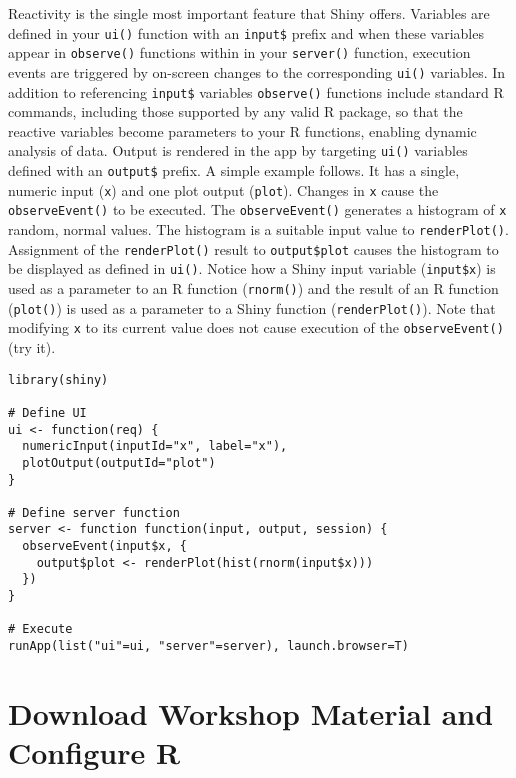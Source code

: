 \documentclass[10pt, letterpaper]{article}
\begin{document}
\begin{spacing}{1.0}
Reactivity is the single most important feature that Shiny offers.  Variables are defined in your \texttt{ui()} function with an \texttt{input\$} prefix and when these variables appear in \texttt{observe()} functions within in your \texttt{server()} function, execution events are triggered by on-screen changes to the corresponding \texttt{ui()} variables.  In addition to referencing \texttt{input\$} variables \texttt{observe()} functions include standard R commands, including those supported by any valid R package, so that the reactive variables become parameters to your R functions, enabling dynamic analysis of data.  Output is rendered in the app by targeting \texttt{ui()} variables defined with an \texttt{output\$} prefix.  A simple example follows.  It has a single, numeric input (\texttt{x}) and one plot output (\texttt{plot}).  Changes in \texttt{x} cause the \texttt{observeEvent()} to be executed.  The \texttt{observeEvent()} generates a histogram of \texttt{x} random, normal values.  The histogram is a suitable input value to \texttt{renderPlot()}.  Assignment of the \texttt{renderPlot()} result to \texttt{output\$plot} causes the histogram to be displayed as defined in \texttt{ui()}.  Notice how a Shiny input variable (\texttt{input\$x}) is used as a parameter to an R function (\texttt{rnorm()}) and the result of an R function (\texttt{plot()}) is used as a parameter to a Shiny function (\texttt{renderPlot()}).  Note that modifying \texttt{x} to its current value does not cause execution of the \texttt{observeEvent()} (try it).

\vspace{0.1in}

\small
\begin{verbatim}
library(shiny)

# Define UI
ui <- function(req) {
  numericInput(inputId="x", label="x"),
  plotOutput(outputId="plot")
}

# Define server function
server <- function function(input, output, session) {
  observeEvent(input$x, {
    output$plot <- renderPlot(hist(rnorm(input$x)))
  })
}

# Execute
runApp(list("ui"=ui, "server"=server), launch.browser=T)
\end{verbatim}
\normalsize


\vspace{0.1in}

\section{Download Workshop Material and Configure R}\label{sec:accesworkshopmaterial}


\end{spacing}
\end{document}
